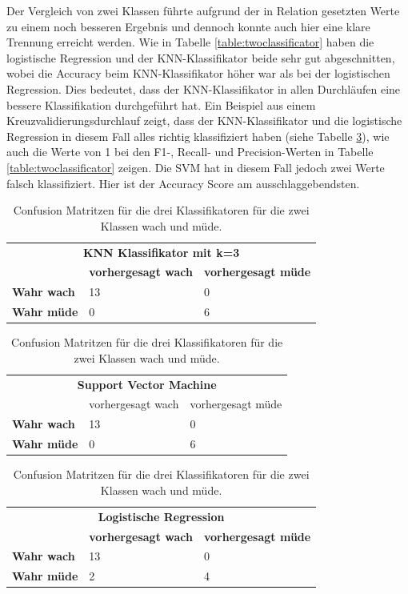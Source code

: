 Der Vergleich von zwei Klassen führte aufgrund der in Relation gesetzten Werte zu einem noch besseren Ergebnis und dennoch konnte auch hier eine klare Trennung erreicht werden. Wie in Tabelle \ref{table:twoclassificator} haben die logistische Regression und der KNN-Klassifikator beide sehr gut abgeschnitten, wobei die Accuracy beim KNN-Klassifikator höher war als bei der logistischen Regression. Dies bedeutet, dass der KNN-Klassifikator in allen Durchläufen eine bessere Klassifikation durchgeführt hat. Ein Beispiel aus einem Kreuzvalidierungsdurchlauf zeigt, dass der KNN-Klassifikator und die logistische Regression in diesem Fall alles richtig klassifiziert haben (siehe Tabelle \ref{table:confusionmatrixtwoclasses}), wie auch die Werte von 1 bei den F1-, Recall- und Precision-Werten in Tabelle \ref{table:twoclassificator} zeigen. Die SVM hat in diesem Fall jedoch zwei Werte falsch klassifiziert. Hier ist der Accuracy Score am ausschlaggebendsten.


\begin{table}
    \centering
    \begin{tabular}{lll}

    \multicolumn{3}{c}{\textbf{KNN Klassifikator mit k=3}}\\
    & \textbf{vorhergesagt wach} & \textbf{vorhergesagt müde} \\ \hline
    \textbf{Wahr wach} & 13 & 0 \\ 
    \textbf{Wahr müde} & 0 & 6 \\ 
    \end{tabular}
    
    \vspace{0.5cm} %
    
    \begin{tabular}{lll}
    
    \multicolumn{3}{c}{\textbf{Support Vector Machine}}\\
    & vorhergesagt wach & vorhergesagt müde \\ \hline
    \textbf{Wahr wach} & 13 & 0 \\ 
   \textbf{ Wahr müde} & 0 & 6 \\ 
    \end{tabular}
    
    \vspace{0.5cm} %
    
    \begin{tabular}{lll}
    
    \multicolumn{3}{c}{\textbf{Logistische Regression}} \\ 
    & \textbf{vorhergesagt wach} & \textbf{vorhergesagt müde} \\ \hline
   \textbf{ Wahr wach} & 13 & 0 \\ 
    \textbf{Wahr müde }& 2 & 4 \\ 
    \end{tabular}
\caption{Confusion Matritzen für die drei Klassifikatoren für die zwei Klassen wach und müde.}
\label{table:confusionmatrixtwoclasses}
\end{table}

